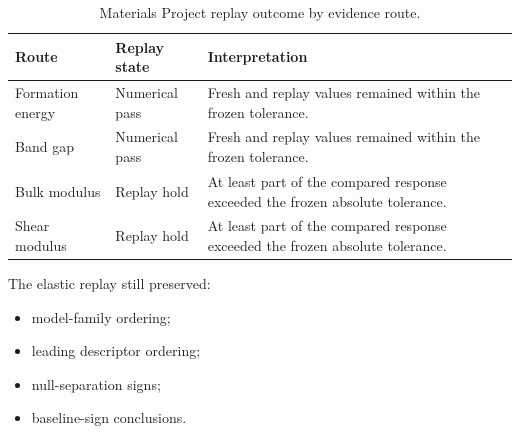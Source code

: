 \documentclass[11pt,a4paper,oneside]{report}
\begin{document}
\begin{table}[H]



\centering



\caption{Materials Project replay outcome by evidence route.}



\label{tab:mp-replay-outcome}



\begin{tabularx}{\textwidth}{L{0.23\textwidth}
    L{0.23\textwidth}
    Y
}
\toprule
\textbf{Route}
&
\textbf{Replay state}
&
\textbf{Interpretation}
\\
\midrule
Formation energy
&
Numerical pass
&
Fresh and replay values remained within the frozen tolerance.
\\
\addlinespace
Band gap
&
Numerical pass
&
Fresh and replay values remained within the frozen tolerance.
\\
\addlinespace
Bulk modulus
&
Replay hold
&
At least part of the compared response exceeded the frozen absolute
tolerance.
\\
\addlinespace
Shear modulus
&
Replay hold
&
At least part of the compared response exceeded the frozen absolute
tolerance.
\\
\bottomrule
\end{tabularx}



\end{table}





The elastic replay still preserved:



\begin{itemize}



\item

model-family ordering;



\item

leading descriptor ordering;



\item

null-separation signs;



\item

baseline-sign conclusions.



\end{itemize}
\end{document}
